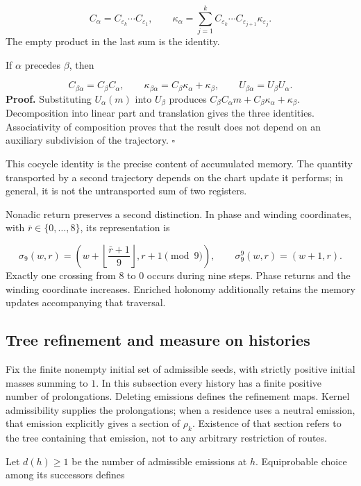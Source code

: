 \[
C_\alpha=C_{\varepsilon_k}\cdots C_{\varepsilon_1},
\qquad
\kappa_\alpha=
\sum_{j=1}^{k}C_{\varepsilon_k}\cdots
C_{\varepsilon_{j+1}}\kappa_{\varepsilon_j}.
\]
The empty product in the last sum is the identity.

If \(\alpha\) precedes \(\beta\), then

\[
C_{\beta\alpha}=C_\beta C_\alpha,
\qquad
\kappa_{\beta\alpha}=C_\beta\kappa_\alpha+\kappa_\beta,
\qquad
U_{\beta\alpha}=U_\beta U_\alpha.
\]
\textbf{Proof.} Substituting \(U_\alpha(m)\) into \(U_\beta\) produces \(C_\beta C_\alpha m+C_\beta\kappa_\alpha+\kappa_\beta\). Decomposition into linear part and translation gives the three identities. Associativity of composition proves that the result does not depend on an auxiliary subdivision of the trajectory. \hfill\(\square\)

This cocycle identity is the precise content of accumulated memory. The quantity transported by a second trajectory depends on the chart update it performs; in general, it is not the untransported sum of two registers.

Nonadic return preserves a second distinction. In phase and winding coordinates, with \(\bar r\in\{0,\ldots,8\}\), its representation is

\[
\sigma_9(w,r)=
\left(w+\left\lfloor\frac{\bar r+1}{9}\right\rfloor,
r+1\pmod9\right),
\qquad
\sigma_9^9(w,r)=(w+1,r).
\]
Exactly one crossing from \(8\) to \(0\) occurs during nine steps. Phase returns and the winding coordinate increases. Enriched holonomy additionally retains the memory updates accompanying that traversal.

\subsection{Tree refinement and measure on histories}
Fix the finite nonempty initial set of admissible seeds, with strictly positive initial masses summing to \(1\). In this subsection every history has a finite positive number of prolongations. Deleting emissions defines the refinement maps. Kernel admissibility supplies the prolongations; when a residence uses a neutral emission, that emission explicitly gives a section of \(\rho_k\). Existence of that section refers to the tree containing that emission, not to any arbitrary restriction of routes.

Let \(d(h)\geq1\) be the number of admissible emissions at \(h\). Equiprobable choice among its successors defines

